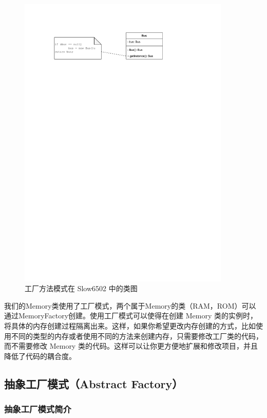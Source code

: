 \documentclass[cn,black,12pt,normal]{elegantnote}
\begin{document}
\begin{figure}[H]
  \centering
  \includegraphics[width=0.9\textwidth]{figures/单例.pdf}
  \caption{工厂方法模式在 Slow6502 中的类图}
\end{figure}

我们的Memory类使用了工厂模式，两个属于Memory的类（RAM，ROM）可以通过MemoryFactory创建。使用工厂模式可以使得在创建 Memory 类的实例时，将具体的内存创建过程隔离出来。这样，如果你希望更改内存创建的方式，比如使用不同的类型的内存或者使用不同的方法来创建内存，只需要修改工厂类的代码，而不需要修改 Memory 类的代码。这样可以让你更方便地扩展和修改项目，并且降低了代码的耦合度。


\subsection{抽象工厂模式（Abstract Factory）}

\subsubsection{抽象工厂模式简介}
\end{document}
